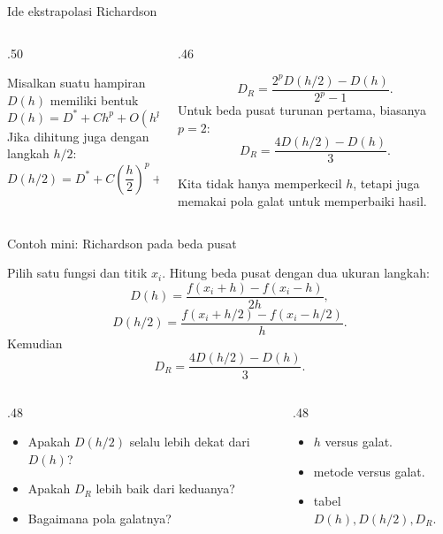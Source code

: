 \documentclass[aspectratio=169,10pt]{beamer}
\begin{document}
\begin{frame}{Ide ekstrapolasi Richardson}
\scriptsize
\begin{columns}[T,totalwidth=\textwidth]
\begin{column}{.50\textwidth}
\begin{bluebox}
Misalkan suatu hampiran $D(h)$ memiliki bentuk
\[
D(h)=D^\ast+C h^p+O(h^{p+1}).
\]
Jika dihitung juga dengan langkah $h/2$:
\[
D(h/2)=D^\ast+C\left(\frac{h}{2}\right)^p+O(h^{p+1}).
\]
\end{bluebox}
\end{column}
\begin{column}{.46\textwidth}
\begin{orangebox}
\[
D_R=\frac{2^pD(h/2)-D(h)}{2^p-1}.
\]
Untuk beda pusat turunan pertama, biasanya $p=2$:
\[
D_R=\frac{4D(h/2)-D(h)}{3}.
\]
\end{orangebox}
\begin{greenbox}[Intuisi]
Kita tidak hanya memperkecil $h$, tetapi juga memakai pola galat untuk memperbaiki hasil.
\end{greenbox}
\end{column}
\end{columns}
\end{frame}

\begin{frame}{Contoh mini: Richardson pada beda pusat}
\scriptsize
\begin{bluebox}
Pilih satu fungsi dan titik $x_i$. Hitung beda pusat dengan dua ukuran langkah:
\[
D(h)=\frac{f(x_i+h)-f(x_i-h)}{2h},
\]
\[
D(h/2)=\frac{f(x_i+h/2)-f(x_i-h/2)}{h}.
\]
Kemudian
\[
D_R=\frac{4D(h/2)-D(h)}{3}.
\]
\end{bluebox}
\begin{columns}[T,totalwidth=\textwidth]
\begin{column}{.48\textwidth}
\begin{orangebox}
\begin{itemize}\setlength\itemsep{2pt}
\item Apakah $D(h/2)$ selalu lebih dekat dari $D(h)$?
\item Apakah $D_R$ lebih baik dari keduanya?
\item Bagaimana pola galatnya?
\end{itemize}
\end{orangebox}
\end{column}
\begin{column}{.48\textwidth}
\begin{greenbox}
\begin{itemize}\setlength\itemsep{2pt}
\item $h$ versus galat.
\item metode versus galat.
\item tabel $D(h),D(h/2),D_R$.
\end{itemize}
\end{greenbox}
\end{column}
\end{columns}
\end{frame}
\end{document}
